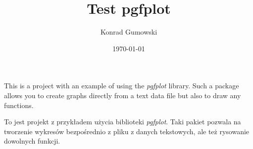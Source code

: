 \documentclass{article}[12]
\title{Test pgfplot}
\author{Konrad Gumowski}
\date{\today}
\begin{document}

    This is a project with an example of using the \textit{pgfplot} library. Such a package allows you to create graphs directly from a text data file but also to draw any functions.
    \vspace{5mm}
    
    To jest projekt z przykładem użycia biblioteki \textit{pgfplot}. Taki pakiet pozwala na tworzenie wykresów bezpośrednio z pliku z danych tekstowych, ale też rysowanie dowolnych funkcji.

   
   

\end{document}
